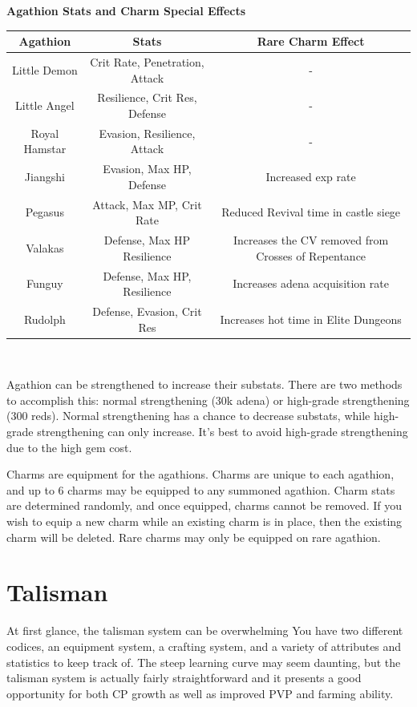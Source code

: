 \documentclass[]{article}
\begin{document}
\begin{center}
\textbf{Agathion Stats and Charm Special Effects}
\begin{tabular}{|c|c|c|}
	\hline 
	Agathion & Stats & Rare Charm Effect \\ 
	\hline 
	Little Demon & Crit Rate, Penetration, Attack & - \\ 
	Little Angel & Resilience, Crit Res, Defense & - \\ 
	Royal Hamstar & Evasion, Resilience, Attack & - \\ 
	Jiangshi & Evasion, Max HP, Defense & Increased exp rate \\ 
	Pegasus & Attack, Max MP, Crit Rate & Reduced Revival time in castle siege \\ 
	Valakas & Defense, Max HP Resilience & Increases the CV removed from Crosses of Repentance \\ 
	Funguy & Defense, Max HP, Resilience & Increases adena acquisition rate \\ 
	Rudolph & Defense, Evasion, Crit Res & Increases hot time in Elite Dungeons \\ 
	\hline 
\end{tabular} 
\\

\end{center}

Agathion can be strengthened to increase their substats.
There are two methods to accomplish this: normal strengthening (30k adena) or high-grade strengthening (300 reds).
Normal strengthening has a chance to decrease substats, while high-grade strengthening can only increase.
It's best to avoid high-grade strengthening due to the high gem cost.

Charms are equipment for the agathions.
Charms are unique to each agathion, and up to 6 charms may be equipped to any summoned agathion.
Charm stats are determined randomly, and once equipped, charms cannot be removed.
If you wish to equip a new charm while an existing charm is in place, then the existing charm will be deleted.
Rare charms may only be equipped on rare agathion.


\section{Talisman}

At first glance, the talisman system can be overwhelming
You have two different codices, an equipment system, a crafting system, and a variety of attributes and statistics to keep track of.
The steep learning curve may seem daunting, but the talisman system is actually fairly straightforward and it presents a good opportunity for both CP growth as well as improved PVP and farming ability.
\end{document}

